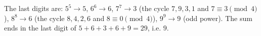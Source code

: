 The last digits are: $5^5\to5$, $6^6\to6$, $7^7\to3$ (the cycle $7,9,3,1$ and $7\equiv3\pmod4$), $8^8\to6$ (the cycle $8,4,2,6$ and $8\equiv0\pmod4$), $9^9\to9$ (odd power). The sum ends in the last digit of $5+6+3+6+9=29$, i.e. $\boxed{9}$.
